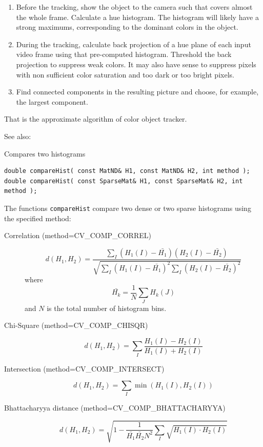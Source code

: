 \begin{enumerate}
 \item Before the tracking, show the object to the camera such that covers almost the whole frame. Calculate a hue histogram. The histogram will likely have a strong maximums, corresponding to the dominant colors in the object.
 \item During the tracking, calculate back projection of a hue plane of each input video frame using that pre-computed histogram. Threshold the back projection to suppress weak colors. It may also have sense to suppress pixels with non sufficient color saturation and too dark or too bright pixels.
 \item Find connected components in the resulting picture and choose, for example, the largest component.
\end{enumerate}

That is the approximate algorithm of  color object tracker.

See also: 

Compares two histograms

\begin{lstlisting}
double compareHist( const MatND& H1, const MatND& H2, int method );
double compareHist( const SparseMat& H1, const SparseMat& H2, int method );
\end{lstlisting}
\begin{description}
\end{description}

The functions \texttt{compareHist} compare two dense or two sparse histograms using the specified method:

\begin{description}
\item[Correlation (method=CV\_COMP\_CORREL)]
\[
d(H_1,H_2) = \frac
{\sum_I (H_1(I) - \bar{H_1}) (H_2(I) - \bar{H_2})}
{\sqrt{\sum_I(H_1(I) - \bar{H_1})^2 \sum_I(H_2(I) - \bar{H_2})^2}}
\]
where
\[
\bar{H_k} = \frac{1}{N} \sum_J H_k(J)
\]
and $N$ is the total number of histogram bins.

\item[Chi-Square (method=CV\_COMP\_CHISQR)]
\[ d(H_1,H_2) = \sum_I \frac{H_1(I)-H_2(I)}{H_1(I)+H_2(I)} \]

\item[Intersection (method=CV\_COMP\_INTERSECT)]
\[ d(H_1,H_2) = \sum_I \min (H_1(I), H_2(I)) \]

\item[Bhattacharyya distance (method=CV\_COMP\_BHATTACHARYYA)]
\[ d(H_1,H_2) = \sqrt{1 - \frac{1}{\bar{H_1} \bar{H_2} N^2} \sum_I \sqrt{H_1(I) \cdot H_2(I)}} \]

\end{description}

